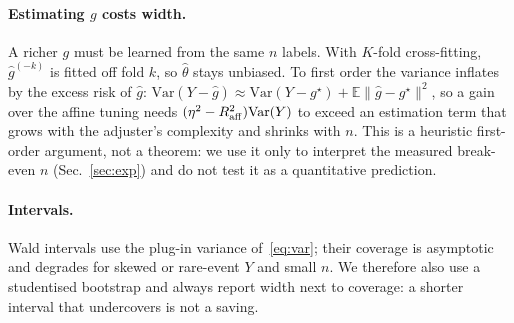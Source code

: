 \paragraph{Estimating $g$ costs width.}
A richer $g$ must be learned from the same $n$ labels. With $K$-fold cross-fitting, $\hat g^{(-k)}$ is fitted off fold $k$,
so $\hat\theta$ stays unbiased. To first order the variance inflates by the excess risk of $\hat g$:
$\mathrm{Var}(Y-\hat g)\approx\mathrm{Var}(Y-g^\star)+\mathbb E\|\hat g-g^\star\|^2$, so a gain over the affine
tuning needs $(\eta^2-R^2_{\rm aff})\mathrm{Var}(Y)$ to exceed an estimation term that grows with the
adjuster's complexity and shrinks with $n$. This is a heuristic first-order argument, not a theorem: we
use it only to interpret the measured break-even $n$ (Sec.~\ref{sec:exp}) and do not test it as a quantitative prediction.

\paragraph{Intervals.} Wald intervals use the plug-in variance of~\eqref{eq:var}; their coverage is
asymptotic and degrades for skewed or rare-event $Y$ and small $n$. We therefore also use a studentised
bootstrap and always report width next to coverage: a shorter interval that undercovers is not a saving.
